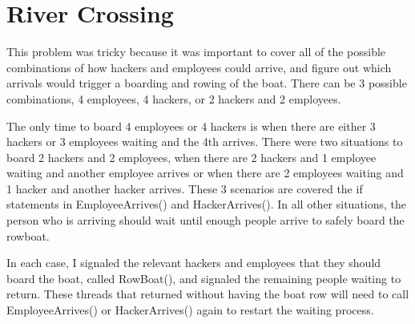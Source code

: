 \documentclass{article}
\begin{document}
\section{River Crossing}

This problem was tricky because it was important to cover all of the possible combinations of how hackers and employees could arrive, and figure out which arrivals would trigger a boarding and rowing of the boat. There can be 3 possible combinations, 4 employees, 4 hackers, or 2 hackers and 2 employees.

The only time to board 4 employees or 4 hackers is when there are either 3 hackers or 3 employees waiting and the 4th arrives. There were two situations to board 2 hackers and 2 employees, when there are 2 hackers and 1 employee waiting and another employee arrives or when there are 2 employees waiting and 1 hacker and another hacker arrives. These 3 scenarios are covered the if statements in EmployeeArrives() and HackerArrives(). In all other situations, the person who is arriving should wait until enough people arrive to safely board the rowboat.

In each case, I signaled the relevant hackers and employees that they should board the boat, called RowBoat(), and signaled the remaining people waiting to return. These threads that returned without having the boat row will need to call EmployeeArrives() or HackerArrives() again to restart the waiting process.
\end{document}
